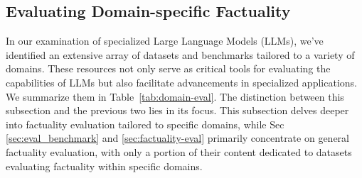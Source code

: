 \subsection{Evaluating Domain-specific Factuality}



\label{sec:domain-eval}


In our examination of specialized Large Language Models (LLMs), we've identified an extensive array of datasets and benchmarks tailored to a variety of domains.  These resources not only serve as critical tools for evaluating the capabilities of LLMs but also facilitate advancements in specialized applications. We summarize them in Table~\ref{tab:domain-eval}. The distinction between this subsection and the previous two lies in its focus. This subsection delves deeper into factuality evaluation tailored to specific domains, while Sec \ref{sec:eval_benchmark} and \ref{sec:factuality-eval} primarily concentrate on general factuality evaluation, with only a portion of their content dedicated to datasets evaluating factuality within specific domains.


